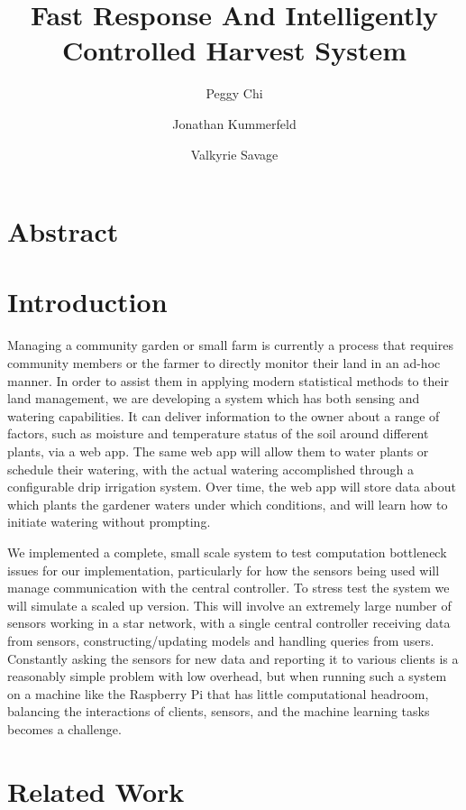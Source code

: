 \documentclass[a4paper]{article}
\begin{document}
\title{Fast Response And Intelligently Controlled Harvest System}
\author{Peggy Chi \and Jonathan Kummerfeld \and Valkyrie Savage}
\maketitle

\section{Abstract}

\section{Introduction}

Managing a community garden or small farm is currently a process that requires community members or the farmer to directly monitor their land in an ad-hoc manner.  In order to assist them in applying modern statistical methods to their land management, we are developing a system which has both sensing and watering capabilities. It can deliver information to the owner about a range of factors, such as moisture and temperature status of the soil around different plants, via a web app.  The same web app will allow them to water plants or schedule their watering, with the actual watering accomplished through a configurable drip irrigation system.  Over time, the web app will store data about which plants the gardener waters under which conditions, and will learn how to initiate watering without prompting.

We implemented a complete, small scale system to test computation bottleneck issues for our implementation, particularly for how the sensors being used will manage communication with the central controller. To stress test the system we will simulate a scaled up version. This will involve an extremely large number of sensors working in a star network, with a single central controller receiving data from sensors, constructing/updating models and handling queries from users.  Constantly asking the sensors for new data and reporting it to various clients is a reasonably simple problem with low overhead, but when running such a system on a machine like the Raspberry Pi that has little computational headroom, balancing the interactions of clients, sensors, and the machine learning tasks becomes a challenge.

\section{Related Work}
\end{document}
